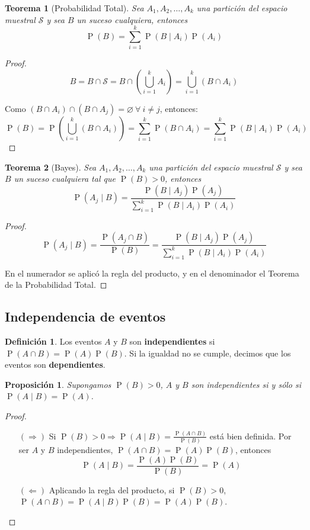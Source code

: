 \documentclass[11pt]{article}
\theoremstyle{plain}
\newtheorem*{teo}{Teorema}
\newtheorem*{pro}{Proposición}
\theoremstyle{definition}
\newtheorem*{defi}{Definición}
\theoremstyle{remark}
\newcommand{\deft}[1]{\textbf{#1}}  %
\newcommand{\proba}{\ensuremath{\operatorname{P}}}  %
\newcommand{\espm}[0]{\ensuremath{\mathcal{S}}}  %
\newcommand{\foralle}{\ensuremath{\forall \ }}  %
\begin{document}
    \begin{teo}[Probabilidad Total]
      Sea $A_1, A_2, \dots, A_k$ una partición del espacio muestral $\espm$ y sea $B$ un suceso cualquiera, entonces
      \[ \proba(B) = \sum_{i=1}^k \proba(B \mid A_i) \proba(A_i) \]
    \end{teo}

    \begin{proof}
      \[ B = B \cap \espm = B \cap \left( \bigcup_{i=1}^k A_i \right) = \bigcup_{i=1}^k (B \cap A_i) \]

      Como $(B \cap A_i) \cap (B \cap A_j) = \varnothing \ \foralle i \neq j$, entonces:
      \[ \proba(B) = \proba \left( \bigcup_{i=1}^k (B \cap A_i) \right) = \sum_{i=1}^k \proba(B \cap A_i) = \sum_{i=1}^k \proba(B \mid A_i) \proba(A_i)\]
    \end{proof}

    \begin{teo}[Bayes]
      Sea $A_1, A_2, \dots, A_k$ una partición del espacio muestral $\espm$ y sea $B$ un suceso cualquiera tal que $\proba(B) > 0$, entonces
      \[ \proba(A_j \mid B) = \frac{\proba(B \mid A_j) \proba(A_j)}{\sum_{i=1}^k \proba(B \mid A_i) \proba(A_i)} \]
    \end{teo}

    \begin{proof}
      \[ \proba(A_j \mid B) = \frac{\proba(A_j \cap B)}{\proba(B)} = \frac{\proba(B \mid A_j) \proba(A_j)}{\sum_{i=1}^k \proba(B \mid A_i) \proba(A_i)} \]

      En el numerador se aplicó la regla del producto, y en el denominador el Teorema de la Probabilidad Total.
    \end{proof}

  \subsection{Independencia de eventos}
    \begin{defi}
      Los eventos $A$ y $B$ son \deft{independientes} si $\proba(A \cap B) = \proba(A) \proba(B)$. Si la igualdad no se cumple, decimos que los eventos son \deft{dependientes}.
    \end{defi}

    \begin{pro}
      Supongamos $\proba(B) > 0$, $A$ y $B$ son independientes si y sólo si $\proba(A \mid B) = \proba(A)$.
    \end{pro}
    \begin{proof} \
      \begin{itemize}
        \item[$(\Rightarrow)$] Si $\proba(B) > 0 \Rightarrow \proba(A \mid B) = \frac{\proba(A \cap B)}{\proba(B)}$ está bien definida. Por ser $A$ y $B$ independientes, $\proba(A \cap B) = \proba(A) \proba(B)$, entonces
        \[ \proba(A \mid B) = \frac{\proba(A) \proba(B)}{\proba(B)} = \proba(A) \]
        \item[$(\Leftarrow)$] Aplicando la regla del producto, si $\proba(B) > 0$, $\proba(A \cap B) = \proba(A \mid B) \proba(B) = \proba(A) \proba (B)$.
      \end{itemize}
    \end{proof}
\end{document}
